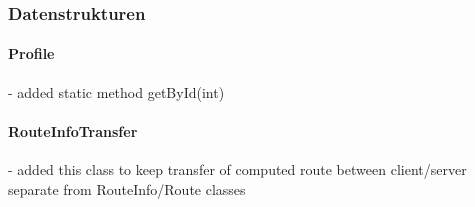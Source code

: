 \subsubsection{Datenstrukturen}

\paragraph{Profile}
- added static method getById(int)

\paragraph{RouteInfoTransfer}
- added this class to keep transfer of computed route between client/server separate from RouteInfo/Route classes